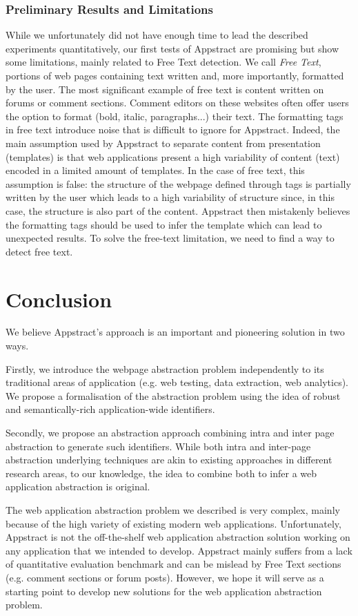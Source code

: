 \subsubsection{Preliminary Results and Limitations}
While we unfortunately did not have enough time to lead the described experiments quantitatively, our first tests of Appstract are promising but show some limitations, mainly related to Free Text detection.
We call \textit{Free Text}, portions of web pages containing text written and, more importantly, formatted by the user. The most significant example of free text is content written on forums or comment sections.  Comment editors on these websites often offer users the option to format (bold, italic, paragraphs...) their text. The formatting tags in free text introduce noise that is difficult to ignore for Appstract. Indeed, the main assumption used by Appstract to separate content from presentation (templates) is that web applications present a high variability of content (text) encoded in a limited amount of templates. In the case of free text, this assumption is false: the structure of the webpage defined through tags is partially written by the user which leads to a high variability of structure since, in this case, the structure is also part of the content. Appstract then mistakenly believes the formatting tags should be used to infer the template which can lead to unexpected results.
To solve the free-text limitation, we need to find a way to detect free text.

\section{Conclusion}\label{appstract:sec:conclusion}
We believe Appstract's approach is an important and pioneering solution in two ways.

Firstly, we introduce the webpage abstraction problem independently to its traditional areas of application (e.g. web testing, data extraction, web analytics). We propose a formalisation of the abstraction problem using the idea of robust and semantically-rich application-wide identifiers.

Secondly, we propose an abstraction approach combining intra and inter page abstraction to generate such identifiers. While both intra and inter-page abstraction underlying techniques are akin to existing approaches in different research areas, to our knowledge, the idea to combine both to infer a web application abstraction is original.

The web application abstraction problem we described is very complex, mainly because of the high variety of existing modern web applications. Unfortunately, Appstract is not the off-the-shelf web application abstraction solution working on any application that we intended to develop. Appstract mainly suffers from a lack of quantitative evaluation benchmark and can be mislead by Free Text sections (e.g. comment sections or forum posts). However, we hope it will serve as a starting point to develop new solutions for the web application abstraction problem.